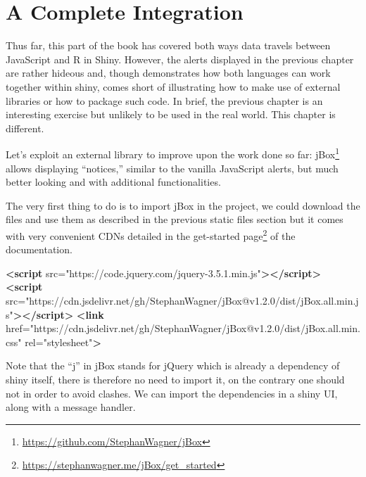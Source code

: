 \documentclass[
]{krantz}
\makeatletter
\newenvironment{Shaded}{\begin{snugshade}}{\end{snugshade}}
\newcommand{\KeywordTok}[1]{\textcolor[rgb]{0.27,0.27,0.27}{\textbf{#1}}}
\newcommand{\OtherTok}[1]{\textcolor[rgb]{0.37,0.37,0.37}{#1}}
\newcommand{\StringTok}[1]{\textcolor[rgb]{0.5,0.5,0.5}{#1}}
\renewcommand{\href}[2]{#2\footnote{\url{#1}}}
\newenvironment{kframe}{%
\medskip{}
\setlength{\fboxsep}{.8em}
 \def\at@end@of@kframe{}%
 \ifinner\ifhmode%
  \def\at@end@of@kframe{\end{minipage}}%
  \begin{minipage}{\columnwidth}%
 \fi\fi%
 \def\FrameCommand##1{\hskip\@totalleftmargin \hskip-\fboxsep
 \colorbox{shadecolor}{##1}\hskip-\fboxsep
     \hskip-\linewidth \hskip-\@totalleftmargin \hskip\columnwidth}%
 \MakeFramed {\advance\hsize-\width
   \@totalleftmargin\z@ \linewidth\hsize
   \@setminipage}}%
 {\par\unskip\endMakeFramed%
 \at@end@of@kframe}
\renewenvironment{Shaded}{\begin{kframe}}{\end{kframe}}
\makeatother
\begin{document}
\hypertarget{a-complete-integration}{%
\chapter{A Complete Integration}\label{a-complete-integration}}

Thus far, this part of the book has covered both ways data travels between JavaScript and R in Shiny. However, the alerts displayed in the previous chapter are rather hideous and, though demonstrates how both languages can work together within shiny, comes short of illustrating how to make use of external libraries or how to package such code. In brief, the previous chapter is an interesting exercise but unlikely to be used in the real world. This chapter is different.

Let's exploit an external library to improve upon the work done so far: \href{https://github.com/StephanWagner/jBox}{jBox} allows displaying ``notices,'' similar to the vanilla JavaScript alerts, but much better looking and with additional functionalities.

The very first thing to do is to import jBox in the project, we could download the files and use them as described in the previous static files section but it comes with very convenient CDNs detailed in the \href{https://stephanwagner.me/jBox/get_started}{get-started page} of the documentation.

\begin{Shaded}
\begin{Highlighting}[]
\KeywordTok{<script}\OtherTok{ src=}\StringTok{"https://code.jquery.com/jquery{-}3.5.1.min.js"}\KeywordTok{></script>}
\KeywordTok{<script}\OtherTok{ src=}\StringTok{"https://cdn.jsdelivr.net/gh/StephanWagner/jBox@v1.2.0/dist/jBox.all.min.js"}\KeywordTok{></script>}
\KeywordTok{<link}\OtherTok{ href=}\StringTok{"https://cdn.jsdelivr.net/gh/StephanWagner/jBox@v1.2.0/dist/jBox.all.min.css"}\OtherTok{ rel=}\StringTok{"stylesheet"}\KeywordTok{>}
\end{Highlighting}
\end{Shaded}

Note that the ``j'' in jBox stands for jQuery which is already a dependency of shiny itself, there is therefore no need to import it, on the contrary one should not in order to avoid clashes. We can import the dependencies in a shiny UI, along with a message handler.
\end{document}
